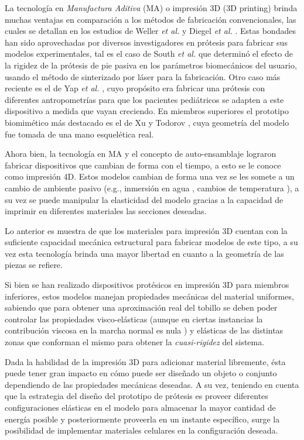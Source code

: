 \documentclass[12pt,english]{article}
\begin{document}
La tecnología en \emph{Manufactura Aditiva} (MA)
o impresión 3D (3D printing) brinda muchas ventajas en comparación
a los métodos de fabricación convencionales, las cuales se detallan
en los estudios de Weller \emph{et al.} \cite{Weller2015} y Diegel
\emph{et al.} \cite{Diegel2014}. Estas bondades han sido aprovechadas
por diversos investigadores en prótesis para fabricar sus modelos
experimentales, tal es el caso de South \emph{et al.}\cite{South2010}
que determinó el efecto de la rigidez de la prótesis de pie pasiva
en los parámetros biomecánicos del usuario, usando el método de sinterizado
por láser para la fabricación. Otro caso más reciente es el de Yap
\emph{et al.} \cite{Yap2015}, cuyo propósito era fabricar una prótesis
con diferentes antropometrías para que los pacientes pediátricos se
adapten a este dispositivo a medida que vayan creciendo. En miembros
superiores el prototipo biomimético más destacado es el de Xu y Todorov
\cite{Xu2016}, cuya geometría del modelo fue tomada de una mano esquelética
real.

Ahora bien, la tecnología en MA y el concepto de auto-ensamblaje lograron
fabricar dispositivos que cambian de forma con el tiempo, a esto se
le conoce como impresión 4D. Estos modelos cambian de forma una vez
se les somete a un cambio de ambiente pasivo (e.g., inmersión en agua
\cite{Tibbits2014,Raviv2014}, cambios de temperatura \cite{Yu2015}),
a su vez se puede manipular la elasticidad del modelo gracias a la
capacidad de imprimir en diferentes materiales las secciones deseadas.

Lo anterior es muestra de que los materiales para impresión 3D cuentan
con la suficiente capacidad mecánica estructural para fabricar modelos
de este tipo, a su vez esta tecnología brinda una mayor libertad en
cuanto a la geometría de las piezas se refiere.

Si bien se han realizado dispositivos protésicos en impresión 3D para
miembros inferiores, estos modelos manejan propiedades mecánicas del
material uniformes, sabiendo que para obtener una aproximación real
del tobillo se deben poder controlar las propiedades visco-elásticas
(aunque en ciertas instancias la contribución viscosa en la marcha
normal es nula \cite{Hansen2004}) y elásticas de las distintas zonas
que conforman el mismo para obtener la \emph{cuasi-rigidez} del sistema. 

Dada la habilidad de la impresión 3D para adicionar material libremente,
ésta puede tener gran impacto en cómo puede ser diseñado un objeto
o conjunto dependiendo de las propiedades mecánicas deseadas. A su
vez, teniendo en cuenta que la estrategia del diseño del prototipo
de prótesis es proveer diferentes configuraciones elásticas en el
modelo para almacenar la mayor cantidad de energía posible y posteriormente
proveerla en un instante específico, surge la posibilidad de implementar
materiales celulares en la configuración deseada.
\end{document}
